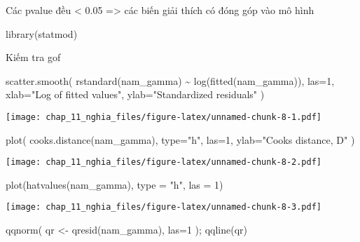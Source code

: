\documentclass[
]{article}
\newenvironment{Shaded}{\begin{snugshade}}{\end{snugshade}}
\newcommand{\AttributeTok}[1]{\textcolor[rgb]{0.77,0.63,0.00}{#1}}
\newcommand{\DecValTok}[1]{\textcolor[rgb]{0.00,0.00,0.81}{#1}}
\newcommand{\FunctionTok}[1]{\textcolor[rgb]{0.00,0.00,0.00}{#1}}
\newcommand{\NormalTok}[1]{#1}
\newcommand{\OtherTok}[1]{\textcolor[rgb]{0.56,0.35,0.01}{#1}}
\newcommand{\SpecialCharTok}[1]{\textcolor[rgb]{0.00,0.00,0.00}{#1}}
\newcommand{\StringTok}[1]{\textcolor[rgb]{0.31,0.60,0.02}{#1}}
\begin{document}
Các pvalue đều \textless{} 0.05 =\textgreater{} các biến giải thích có
đóng góp vào mô hình

\begin{Shaded}
\begin{Highlighting}[]
\FunctionTok{library}\NormalTok{(statmod)}
\end{Highlighting}
\end{Shaded}

Kiếm tra gof

\begin{Shaded}
\begin{Highlighting}[]
\FunctionTok{scatter.smooth}\NormalTok{( }\FunctionTok{rstandard}\NormalTok{(nam\_gamma) }\SpecialCharTok{\textasciitilde{}} \FunctionTok{log}\NormalTok{(}\FunctionTok{fitted}\NormalTok{(nam\_gamma)), }\AttributeTok{las=}\DecValTok{1}\NormalTok{,}
\AttributeTok{xlab=}\StringTok{"Log of fitted values"}\NormalTok{, }\AttributeTok{ylab=}\StringTok{"Standardized residuals"}\NormalTok{ )}
\end{Highlighting}
\end{Shaded}

\texttt{[image: chap\_11\_nghia\_files/figure-latex/unnamed-chunk-8-1.pdf]}

\begin{Shaded}
\begin{Highlighting}[]
\FunctionTok{plot}\NormalTok{( }\FunctionTok{cooks.distance}\NormalTok{(nam\_gamma), }\AttributeTok{type=}\StringTok{"h"}\NormalTok{, }\AttributeTok{las=}\DecValTok{1}\NormalTok{,}
\AttributeTok{ylab=}\StringTok{"Cook\textquotesingle{}s distance, D"}\NormalTok{ )}
\end{Highlighting}
\end{Shaded}

\texttt{[image: chap\_11\_nghia\_files/figure-latex/unnamed-chunk-8-2.pdf]}

\begin{Shaded}
\begin{Highlighting}[]
\FunctionTok{plot}\NormalTok{(}\FunctionTok{hatvalues}\NormalTok{(nam\_gamma), }\AttributeTok{type =} \StringTok{"h"}\NormalTok{, }\AttributeTok{las =} \DecValTok{1}\NormalTok{)}
\end{Highlighting}
\end{Shaded}

\texttt{[image: chap\_11\_nghia\_files/figure-latex/unnamed-chunk-8-3.pdf]}

\begin{Shaded}
\begin{Highlighting}[]
\FunctionTok{qqnorm}\NormalTok{( qr }\OtherTok{\textless{}{-}} \FunctionTok{qresid}\NormalTok{(nam\_gamma), }\AttributeTok{las=}\DecValTok{1}\NormalTok{ ); }\FunctionTok{qqline}\NormalTok{(qr)}
\end{Highlighting}
\end{Shaded}
\end{document}
